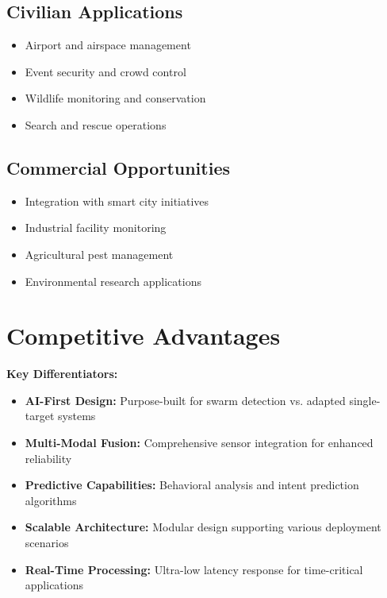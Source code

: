 \documentclass[11pt,a4paper]{article}
\begin{document}
\subsection{Civilian Applications}
\begin{itemize}[leftmargin=2em]
    \item Airport and airspace management
    \item Event security and crowd control
    \item Wildlife monitoring and conservation
    \item Search and rescue operations
\end{itemize}

\subsection{Commercial Opportunities}
\begin{itemize}[leftmargin=2em]
    \item Integration with smart city initiatives
    \item Industrial facility monitoring
    \item Agricultural pest management
    \item Environmental research applications
\end{itemize}

\section{Competitive Advantages}

\begin{highlight}
\textbf{Key Differentiators:}
\begin{itemize}
    \item \textbf{AI-First Design:} Purpose-built for swarm detection vs. adapted single-target systems
    \item \textbf{Multi-Modal Fusion:} Comprehensive sensor integration for enhanced reliability
    \item \textbf{Predictive Capabilities:} Behavioral analysis and intent prediction algorithms
    \item \textbf{Scalable Architecture:} Modular design supporting various deployment scenarios
    \item \textbf{Real-Time Processing:} Ultra-low latency response for time-critical applications
\end{itemize}
\end{highlight}
\end{document}
